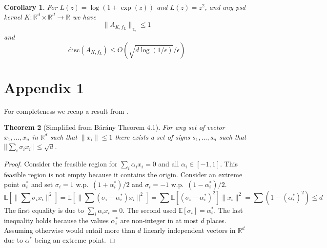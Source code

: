 \documentclass{article} %
\newtheorem{theorem}{Theorem}[section]
\newtheorem{corollary}[theorem]{Corollary}
\newcommand{\ip}[1]{\left \langle #1 \right \rangle}
\newcommand{\R}{\mathbb{R}}
\newcommand{\E}{\mathbb{E}}
\newcommand{\eps}{\epsilon}
\newcommand{\disc}{\text{disc}}
\begin{document}
\begin{corollary}
For $L(z)=\log(1+\exp(z))$ and $L(z) = z^2$, and any psd kernel $K:\R^d \times \R^d \to \R$ we have
$$\|A_{K,f_L}\|_{\gamma_2} \leq 1 $$ 
and
$$\disc(A_{K,f_L}) \leq O(\sqrt{d\log(1/\eps)}/\eps) $$ 
\end{corollary}


%




\section{Appendix 1}
For completeness we recap a result from \cite{barany2008}.
\begin{theorem}[Simplified from B\'ar\'any \cite{barany2008} Theorem 4.1]
For any set of vector $x_1,...,x_n$ in $\R^d$ such that $\|x_i\| \le 1$ there exists a set of signs $s_1,...,s_n$ such that $||\sum_i \sigma_i x_i || \le \sqrt{d}$.
\end{theorem}
\begin{proof}
Consider the feasible region for $\sum_i \alpha_i x_i = 0$ and all $\alpha_i \in [-1,1]$.
This feasible region is not empty because it contains the origin. 
Consider an extreme point $\alpha^*_i$ and set $\sigma_i = 1$ w.p.\ $(1+\alpha^*_i)/2$ and $\sigma_i = -1$ w.p.\ $(1-\alpha^*_i)/2$.
$$
\E[\|\sum \sigma_i x_i\|^2] =  \E[\|\sum (\sigma_i - \alpha^*_i) x_i\|^2] = \sum \E[(\sigma_i - \alpha^*_i)^2] \|x_i\|^2= \sum (1-(\alpha_i^*)^2) \le d
$$
The first equality is due to $\sum_i \alpha_i x_i = 0$. The second used $\E[\sigma_i] = \alpha^*_i $.
The last inequality holds because the values $\alpha^*_i$ are non-integer in at most $d$ places. 
Assuming otherwise would entail more than $d$ linearly independent vectors in $\R^d$ due to $\alpha^*$ being an extreme point.
\end{proof}
\end{document}
